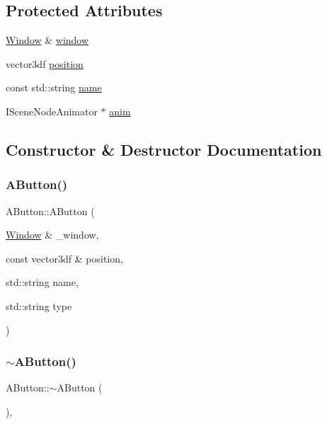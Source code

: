 \subsection*{Protected Attributes}
\begin{DoxyCompactItemize}
\item 
\mbox{\hyperlink{class_window}{Window}} \& \mbox{\hyperlink{class_a_button_ab8b7ee994bd3b81cfd4ad639733c19df}{window}}
\item 
vector3df \mbox{\hyperlink{class_a_button_a71db15822a0eeb093a07e2ac7ff76cd8}{position}}
\item 
const std\+::string \mbox{\hyperlink{class_a_button_aad1d2351e9dc41d747726be929fdb459}{name}}
\item 
I\+Scene\+Node\+Animator $\ast$ \mbox{\hyperlink{class_a_button_a8b1ae0e0646651af3863e0ae6838eddf}{anim}}
\end{DoxyCompactItemize}


\subsection{Constructor \& Destructor Documentation}
\mbox{\label{class_a_button_a6882412288f95e71e2d3eaaac18dacfb}} 
\subsubsection{\texorpdfstring{AButton()}{AButton()}}
{\footnotesize\ttfamily A\+Button\+::\+A\+Button (\begin{DoxyParamCaption}\item[{\mbox{\hyperlink{class_window}{Window}} \&}]{\+\_\+window,  }\item[{const vector3df \&}]{position,  }\item[{std\+::string}]{name,  }\item[{std\+::string}]{type }\end{DoxyParamCaption})}

\mbox{\label{class_a_button_ade4e33830c20aee1b587d56a01689de5}} 
\subsubsection{\texorpdfstring{$\sim$AButton()}{~AButton()}}
{\footnotesize\ttfamily A\+Button\+::$\sim$\+A\+Button (\begin{DoxyParamCaption}{ }\end{DoxyParamCaption})\hspace{0.3cm}{\ttfamily [virtual]}, {\ttfamily [default]}}



